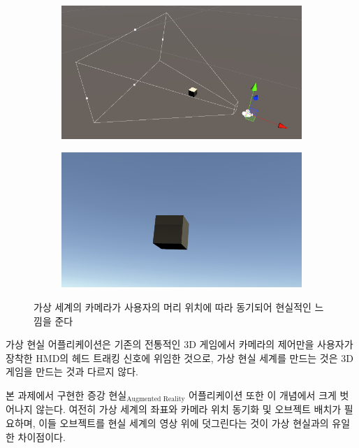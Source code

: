 \documentclass[10pt]{oblivoir}
\begin{document}
\begin{figure}[ht]
    \begin{center}
        \begin{subfigure}{0.4\textwidth}
            \includegraphics[width=\textwidth]{img/vr-example-camera.png}
            \caption{}
        \end{subfigure}
        \begin{subfigure}{0.4\textwidth}
            \includegraphics[width=\textwidth]{img/vr-example-view.png}
            \caption{}
        \end{subfigure}
        \caption{가상 세계의 카메라가 사용자의 머리 위치에 따라 동기되어 현실적인 느낌을 준다}
    \end{center}
\end{figure}

가상 현실 어플리케이션은 기존의 전통적인 3D 게임에서 카메라의 제어만을 사용자가 장착한 HMD의 헤드 트래킹 신호에 위임한 것으로, 가상 현실 세계를 만드는 것은 3D 게임을 만드는 것과 다르지 않다.

본 과제에서 구현한 증강 현실$_\text{Augmented Reality}$ 어플리케이션 또한 이 개념에서 크게 벗어나지 않는다. 여전히 가상 세계의 좌표와 카메라 위치 동기화 및 오브젝트 배치가 필요하며, 이들 오브젝트를 현실 세계의 영상 위에 덧그린다는 것이 가상 현실과의 유일한 차이점이다.
\end{document}
